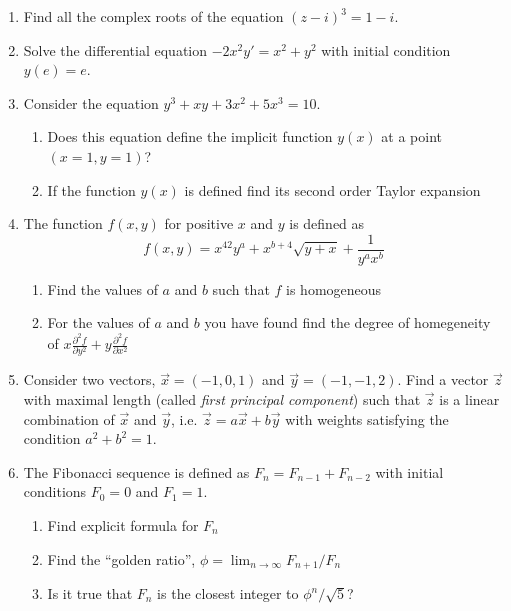 \documentclass[12pt,a4paper]{article}
\begin{document}
\begin{enumerate}

\item Find all the complex roots of the equation $(z-i)^3=1-i$.

\item Solve the differential equation $-2x^2y'=x^2+y^2$ with initial condition $y(e)=e$.

\item Consider the equation $y^3+xy+3x^2+5x^3=10$. 
\begin{enumerate}
\item Does this equation define the implicit function $y(x)$ at a point $(x=1,y=1)$?
\item If the function $y(x)$ is defined find its second order Taylor expansion
\end{enumerate}

\item The function $f(x,y)$ for positive $x$ and $y$ is defined as
\[
f(x,y)=x^{42}y^a + x^{b+4}\sqrt{y+x}+\frac{1}{y^a x^b}
\]

\begin{enumerate}
\item Find the values of $a$ and $b$ such that $f$ is homogeneous
\item For the values of  $a$ and $b$ you have found find the degree of homegeneity of $x\frac{\partial^2 f}{\partial y^2} +y\frac{\partial^2 f}{\partial x^2}$
\end{enumerate}

\item Consider two vectors, $\vec{x}=(-1,0,1)$ and $\vec{y}=(-1,-1,2)$. Find a vector $\vec{z}$ with maximal length (called \textit{first principal component}) such that $\vec{z}$ is a linear combination of $\vec{x}$ and $\vec{y}$, i.e. $\vec{z}=a \vec{x} + b \vec{y}$ with weights satisfying the condition $a^2+b^2=1$.

\item The Fibonacci sequence is defined as $F_n=F_{n-1}+F_{n-2}$ with initial conditions $F_0=0$ and $F_1=1$. 
\begin{enumerate}
\item Find explicit formula for $F_n$
\item Find the ``golden ratio'', $\phi=\lim_{n\to\infty} F_{n+1}/F_n$
\item Is it true that $F_n$ is the closest integer to $\phi^n/\sqrt{5}$?
\end{enumerate}



\end{enumerate}
\end{document}
